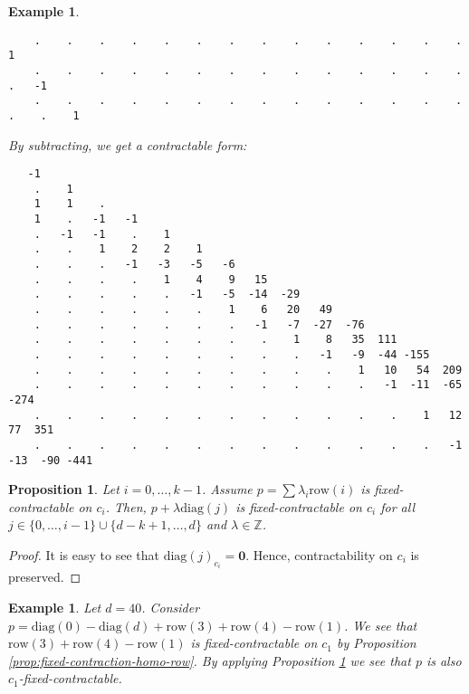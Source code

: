 \documentclass[11pt]{article}
\newtheorem{proposition}[theorem]{Proposition}
\newtheorem{example}[theorem]{Example}
\begin{document}
\begin{example}
\begin{verbatim}
    .    .    .    .    .    .    .    .    .    .    .    .    .    .    1 
    .    .    .    .    .    .    .    .    .    .    .    .    .    .    .   -1 
    .    .    .    .    .    .    .    .    .    .    .    .    .    .    .    .    1 
  \end{verbatim}
  \endgroup
  By subtracting, we get a contractable form:
  \begingroup
  \fontsize{8pt}{10pt}\selectfont
  \begin{verbatim}
   -1 
    .    1 
    1    1    . 
    1    .   -1   -1 
    .   -1   -1    .    1 
    .    .    1    2    2    1 
    .    .    .   -1   -3   -5   -6 
    .    .    .    .    1    4    9   15 
    .    .    .    .    .   -1   -5  -14  -29 
    .    .    .    .    .    .    1    6   20   49 
    .    .    .    .    .    .    .   -1   -7  -27  -76 
    .    .    .    .    .    .    .    .    1    8   35  111 
    .    .    .    .    .    .    .    .    .   -1   -9  -44 -155 
    .    .    .    .    .    .    .    .    .    .    1   10   54  209 
    .    .    .    .    .    .    .    .    .    .    .   -1  -11  -65 -274 
    .    .    .    .    .    .    .    .    .    .    .    .    1   12   77  351 
    .    .    .    .    .    .    .    .    .    .    .    .    .   -1  -13  -90 -441   
  \end{verbatim}
  \endgroup
\end{example}


\begin{proposition}\label{props:fixed-contractable-unirow-stoer}
  Let \( i = 0, \dots, k-1 \). Assume \( p = \sum \lambda_i \mathrm{row}(i) \) is fixed-contractable on \( c_i \). Then, \( p + \lambda \mathrm{diag}(j) \) is fixed-contractable on \( c_i \) for all \( j \in \{ 0, \dots, i-1\} \cup \{d-k+1, \dots, d \} \) and \( \lambda \in \mathbb{Z} \).
\end{proposition}

\begin{proof}
  It is easy to see that \( \mathrm{diag}(j)_{c_i} = \mathbf{0} \). Hence, contractability on \( c_i \) is preserved.
\end{proof}

\begin{example}
  Let \( d = 40 \).
  Consider \( p = \mathrm{diag}(0) - \mathrm{diag}(d) + \mathrm{row}(3) + \mathrm{row}(4) - \mathrm{row}(1) \). We see that \(  \mathrm{row}(3) + \mathrm{row}(4) - \mathrm{row}(1) \) is fixed-contractable on \( c_1 \) by Proposition \ref{prop:fixed-contraction-homo-row}. By applying Proposition \ref{props:fixed-contractable-unirow-stoer} we see that \( p \) is also \( c_1 \)-fixed-contractable.
\end{example}
\end{document}
